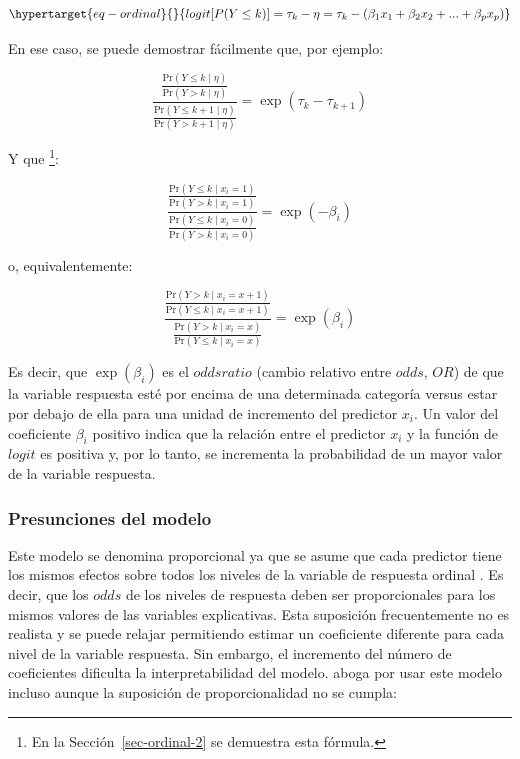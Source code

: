 \documentclass[
  12pt,
  a4paper,
  extrafontsizes,
  onecolumn,
  openright,
  table]{memoir}
\begin{document}
\begin{equation}\protect\hypertarget{eq-ordinal}{}{
logit [P(Y \le k)] = \tau_{k} - \eta = \tau_{k} - (\beta_1 x_1 + \beta_2 x_2 + ... + \beta_p x_p)
}\label{eq-ordinal}\end{equation}

En ese caso, se puede demostrar fácilmente que, por ejemplo:

\[\frac{\frac{\mathrm{Pr}(Y \leq k \mid \eta)}{\mathrm{Pr}(Y > k \mid \eta)}}{\frac{\mathrm{Pr}(Y \leq k+1 \mid \eta)}{\mathrm{Pr}(Y > k+1 \mid \eta)}} = \exp(\tau_{k} - \tau_{k+1})\]

Y que \footnote{En la Sección~\ref{sec-ordinal-2} se demuestra esta
  fórmula.}:

\[\frac{\frac{\mathrm{Pr}(Y \leq k \mid x_i = 1)}{\mathrm{Pr}(Y > k \mid x_i = 1)}}{\frac{\mathrm{Pr}(Y \leq k \mid x_i=0)}{\mathrm{Pr}(Y > k \mid x_i = 0)}} = \exp(-\beta_{i})\]

o, equivalentemente:

\[\frac{\frac{\mathrm{Pr}(Y > k \mid x_i = x + 1)}{\mathrm{Pr}(Y \leq k \mid x_i = x + 1)}}{\frac{\mathrm{Pr}(Y > k \mid x_i = x)}{\mathrm{Pr}(Y \leq k \mid x_i = x)}} = \exp(\beta_{i})\]

Es decir, que \(\exp(\beta_{i})\) es el \(odds ratio\) (cambio relativo
entre \(odds\), \(OR\)) de que la variable respuesta esté por encima de
una determinada categoría versus estar por debajo de ella para una
unidad de incremento del predictor \(x_i\). Un valor del coeficiente
\(\beta_i\) positivo indica que la relación entre el predictor \(x_i\) y
la función de \(logit\) es positiva y, por lo tanto, se incrementa la
probabilidad de un mayor valor de la variable respuesta.

\hypertarget{presunciones-del-modelo}{%
\subsubsection{Presunciones del modelo}\label{presunciones-del-modelo}}

Este modelo se denomina proporcional ya que se asume que cada predictor
tiene los mismos efectos sobre todos los niveles de la variable de
respuesta ordinal \autocite[ver][chap.~5]{Liu2202}. Es decir, que los
\(odds\) de los niveles de respuesta deben ser proporcionales para los
mismos valores de las variables explicativas. Esta suposición
frecuentemente no es realista y se puede relajar permitiendo estimar un
coeficiente diferente para cada nivel de la variable respuesta. Sin
embargo, el incremento del número de coeficientes dificulta la
interpretabilidad del modelo. \textcite{harrell2020} aboga por usar este
modelo incluso aunque la suposición de proporcionalidad no se cumpla:
\end{document}
